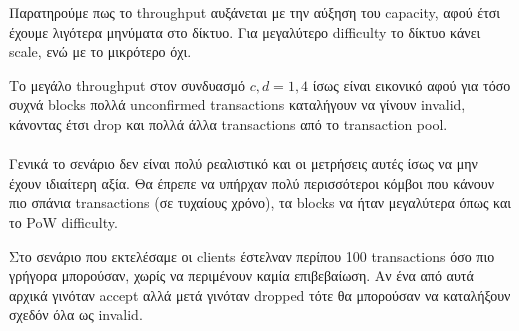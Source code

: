 \documentclass[a4paper,oneside, 12pt]{article}
\begin{document}
Παρατηρούμε πως το throughput αυξάνεται με την αύξηση του capacity, αφού έτσι έχουμε λιγότερα μηνύματα στο δίκτυο. Για μεγαλύτερο difficulty το δίκτυο κάνει scale, ενώ με το μικρότερο όχι.

Το μεγάλο throughput στον συνδυασμό $c,d = 1,4$ ίσως είναι εικονικό αφού για τόσο συχνά blocks πολλά unconfirmed transactions καταλήγουν να γίνουν invalid, κάνοντας έτσι drop και πολλά άλλα transactions από το transaction pool.

\paragraph{}
Γενικά το σενάριο δεν είναι πολύ ρεαλιστικό και οι μετρήσεις αυτές ίσως να μην έχουν ιδιαίτερη αξία.
Θα έπρεπε να υπήρχαν πολύ περισσότεροι κόμβοι που κάνουν πιο σπάνια transactions (σε τυχαίους χρόνο), τα blocks να ήταν μεγαλύτερα όπως και το PoW difficulty. 

Στο σενάριο που εκτελέσαμε οι clients έστελναν περίπου 100 transactions όσο πιο γρήγορα μπορούσαν, χωρίς να περιμένουν καμία επιβεβαίωση. Αν ένα από αυτά αρχικά γινόταν accept αλλά μετά γινόταν dropped τότε θα μπορούσαν να καταλήξουν σχεδόν όλα ως invalid.

\paragraph{}
\end{document}
